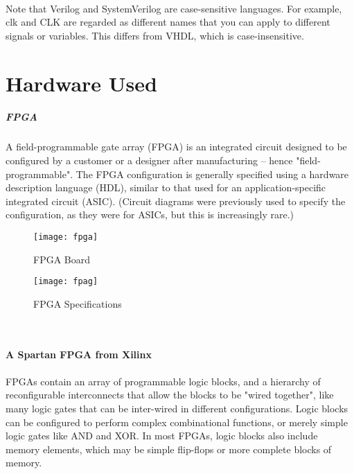 \documentclass[14pt]{report}
\begin{document}
{\paragraph{} Note that Verilog and SystemVerilog are case-sensitive languages. For example, clk and CLK
are regarded as different names that you can apply to different signals or variables. This differs
from VHDL, which is case-insensitive.
\section{Hardware Used}
\subparagraph*{FPGA}
\paragraph{} A field-programmable gate array (FPGA) is an integrated circuit designed to be configured by a customer or a designer after manufacturing – hence "field-programmable". The FPGA configuration is generally specified using a hardware description language (HDL), similar to that used for an application-specific integrated circuit (ASIC). (Circuit diagrams were previously used to specify the configuration, as they were for ASICs, but this is increasingly rare.)
\begin{figure}[ht]
\centering
\texttt{[image: fpga]}
\caption{FPGA Board}
\end{figure}
\begin{figure}[ht]
\centering
\texttt{[image: fpag]}
\caption{FPGA Specifications}
\end{figure}
\\
\\
\textbf{A Spartan FPGA from Xilinx}
\paragraph{} FPGAs contain an array of programmable logic blocks, and a hierarchy of reconfigurable interconnects that allow the blocks to be "wired together", like many logic gates that can be inter-wired in different configurations. Logic blocks can be configured to perform complex combinational functions, or merely simple logic gates like AND and XOR. In most FPGAs, logic blocks also include memory elements, which may be simple flip-flops or more complete blocks of memory.
}
\end{document}
